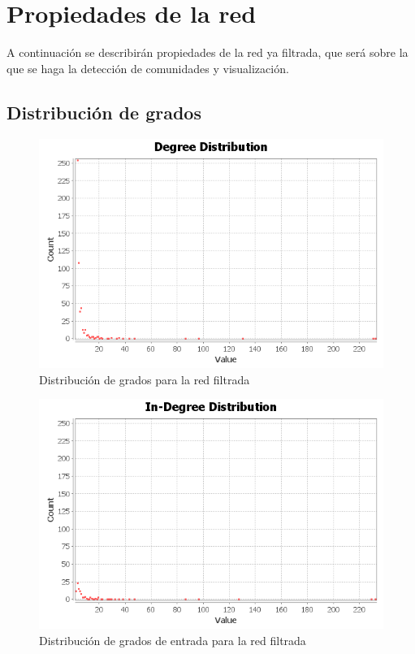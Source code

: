\section{Propiedades de la red}

A continuación se describirán propiedades de la red ya filtrada, que será sobre la que se haga la detección de comunidades y visualización.

\subsection{Distribución de grados}

\begin{figure}[H]
	\centering
	\includegraphics[width=12cm]{img/degree-distribution-filtered}
	\caption{Distribución de grados para la red filtrada}
	\label{fig:degree-distribution-filtered}
\end{figure}

\begin{figure}[H]
	\centering
	\includegraphics[width=12cm]{img/in-degree-distribution-filtered}
	\caption{Distribución de grados de entrada para la red filtrada}
	\label{fig:in-degree-distribution-filtered}
\end{figure}

